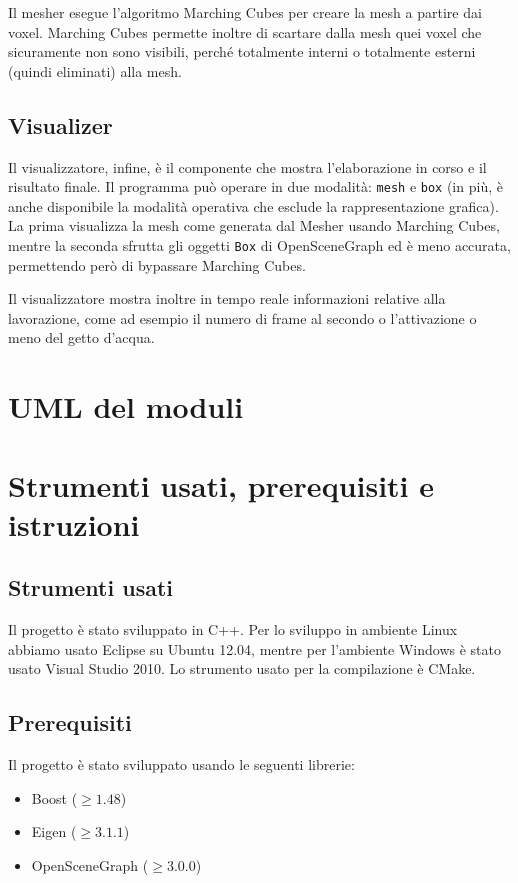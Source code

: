 \documentclass[11pt,a4paper,twoside,openright,titlepage,fleqn,%
               headinclude,,footinclude,BCOR5mm,%
               numbers=noenddot,cleardoublepage=empty,%
               tablecaptionabove]{scrreprt}
\begin{document}
Il mesher esegue l'algoritmo Marching Cubes per creare la mesh a partire dai voxel. Marching Cubes permette inoltre di scartare dalla mesh quei voxel che sicuramente non sono visibili, perché totalmente interni o totalmente esterni (quindi eliminati) alla mesh.

\subsection{Visualizer}

Il visualizzatore, infine, è il componente che mostra l'elaborazione in corso e il risultato finale. Il programma può operare in due modalità: \verb!mesh! e \verb!box! (in più, è anche disponibile la modalità operativa che esclude la rappresentazione grafica). La prima visualizza la mesh come generata dal Mesher usando Marching Cubes, mentre la seconda sfrutta gli oggetti \verb!Box! di OpenSceneGraph ed è meno accurata, permettendo però di bypassare Marching Cubes.

Il visualizzatore mostra inoltre in tempo reale informazioni relative alla lavorazione, come ad esempio il numero di frame al secondo o l'attivazione o meno del getto d'acqua.

\section{UML del moduli}

\section{Strumenti usati, prerequisiti e istruzioni}
\subsection{Strumenti usati}
Il progetto è stato sviluppato in C++. Per lo sviluppo in ambiente Linux abbiamo usato Eclipse su Ubuntu 12.04, mentre per l'ambiente Windows è stato usato Visual Studio 2010. Lo strumento usato per la compilazione è CMake.

\subsection{Prerequisiti}
Il progetto è stato sviluppato usando le seguenti librerie:
\begin{itemize}[noitemsep]
  \item Boost ($\geq 1.48$)
  \item Eigen ($\geq 3.1.1$)
  \item OpenSceneGraph ($\geq 3.0.0$)
\end{itemize}
\end{document}
